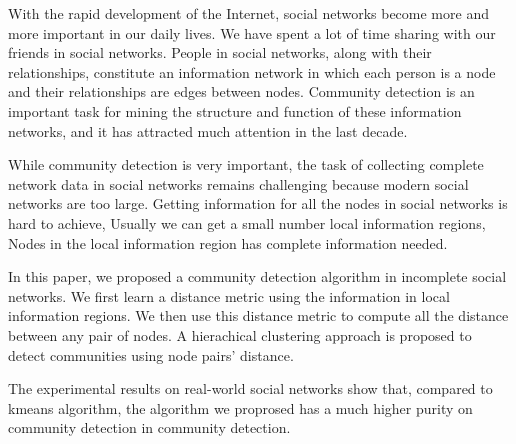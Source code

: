\begin{englishabstract}
    With the rapid development of the Internet, 
    social networks become more and more important in our daily lives.
    We have spent a lot of time sharing with our friends in social networks. 
    People in social networks, along with their relationships, 
    constitute an information network in which each person is a node 
    and their relationships are edges between nodes.
    Community detection is an important task
    for mining the structure and function of these information networks, and it has
    attracted much attention in the last decade.

    While community detection is very important, the task of collecting complete network
    data in social networks remains challenging because modern social networks are too large.
    Getting information for all the nodes in social networks is hard to achieve, 
    Usually we can get a small number local information regions, 
    Nodes in the local information region has complete information needed.

    In this paper, we proposed a community detection algorithm in incomplete social networks.
    We first learn a distance metric using the information in local information regions.
    We then use this distance metric to compute all the distance between any pair of nodes.
    A hierachical clustering approach is proposed to detect communities using node pairs'
    distance.

    The experimental results on real-world social networks show that, compared to kmeans algorithm, the algorithm 
    we proprosed has a much higher purity on community detection in community detection.

\end{englishabstract}
